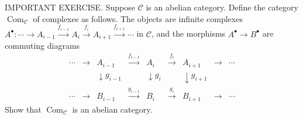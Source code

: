 IMPORTANT EXERCISE. Suppose $\mathcal{C}$ is an abelian category. Define the category $\operatorname{Com}_{\mathcal{C}}$ of complexes as follows. The objects are infinite complexes $A^\bullet: \cdots\to A_{i-1}\xrightarrow{f_{i-1}}A_i\xrightarrow{f_i}A_{i+1}\xrightarrow{f_{i+1}}\cdots$ in $\mathcal{C}$, and the morphisms $A^\bullet\to B^\bullet$ are commuting diagrams
$$\begin{array}{ccccccccc} \cdots&\to&A_{i-1}&\xrightarrow{f_{i-1}}&A_i&\xrightarrow{f_i}&A_{i+1}&\to&\cdots \\ &&\downarrow g_{i-1}&&\downarrow g_i&&\downarrow g_{i+1} \\ \cdots&\to&B_{i-1}&\xrightarrow{g_{i-1}}&B_i&\xrightarrow{g_i}&B_{i+1}&\to&\cdots \end{array}$$
Show that $\operatorname{Com}_{\mathcal{C}}$ is an abelian category.
